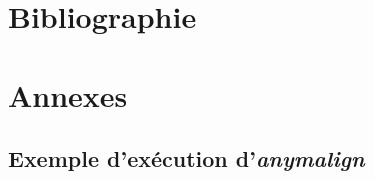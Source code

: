 \documentclass[a4paper,10pt]{article}
\newcommand{\anym}{\emph{anymalign}}
\begin{document}
\section{Bibliographie}




\section{Annexes}






\subsection{Exemple d'exécution d'\anym}
\end{document}
